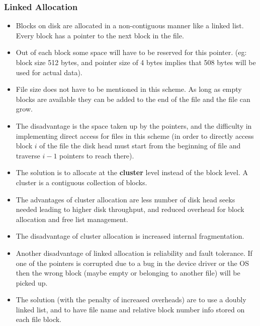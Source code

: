 \documentclass{article}
\theoremstyle{plain}
\theoremstyle{definition}
\begin{document}
\subsubsection{Linked Allocation}
\begin{itemize}
    \item Blocks on disk are allocated in a non-contiguous manner like a linked list. Every block has a pointer to the next block in the file.
    
    \item Out of each block some space will have to be reserved for this pointer. (eg: block size 512 bytes, and pointer size of 4 bytes implies that 508 bytes will be used for actual data).
    
    \item File size does not have to be mentioned in this scheme. As long as empty blocks are available they can be added to the end of the file and the file can grow. 
    
    \item The disadvantage is the space taken up by the pointers, and the difficulty in implementing direct access for files in this scheme (in order to directly access block $i$ of the file the disk head must start from the beginning of file and traverse $i-1$ pointers to reach there). 
    
    \item The solution is to allocate at the \textbf{cluster} level instead of the block level. A cluster is a contiguous collection of blocks. 
    
    \item The advantages of cluster allocation are less number of disk head seeks needed leading to higher disk throughput, and reduced overhead for block allocation and free list management.
    
    \item The disadvantage of cluster allocation is increased internal fragmentation.
    
    \item Another disadvantage of linked allocation is reliability and fault tolerance. If one of the pointers is corrupted due to a bug in the device driver or the OS then the wrong block (maybe empty or belonging to another file) will be picked up.
    
    \item The solution (with the penalty of increased overheads) are to use a doubly linked list, and to have file name and relative block number info stored on each file block.
\end{itemize}
\end{document}
